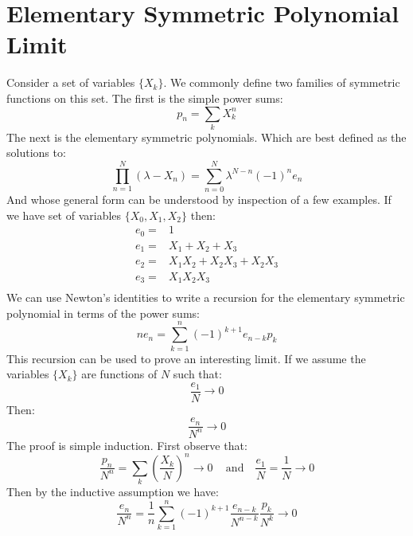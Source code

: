 
\section{Elementary Symmetric Polynomial Limit}
Consider a set of variables $\{X_k\}$.
We commonly define two families of symmetric functions on this set.
The first is the simple power sums:
\[p_n = \sum_{k}X_k^n\]
The next is the elementary symmetric polynomials.
Which are best defined as the solutions to:
\[\prod_{n=1}^{N}(\lambda -X_n) = \sum_{n=0}^{N}\lambda^{N-n}(-1)^ne_n\]
And whose general form can be understood by inspection of a few examples.
If we have set of variables $\{X_0,X_1,X_2\}$ then:
\begin{equation*}
\begin{aligned}
	e_0 =& 1\\
	e_1 =& X_1 +X_2 +X_3\\
	e_2 =& X_1X_2 +X_2X_3 +X_2X_3 \\
	e_3 =& X_1X_2X_3 \\
\end{aligned}
\end{equation*}
We can use Newton's identities to write a recursion for the elementary symmetric polynomial in terms of the power sums:
\[ne_n = \sum_{k=1}^n(-1)^{k+1}e_{n-k}p_k\]
This recursion can be used to prove an interesting limit.
If we assume the variables $\{X_k\}$ are functions of $N$ such that:
\[\frac{e_1}{N} \rightarrow 0\]
Then:
\[\frac{e_n}{N^n} \rightarrow 0\]
The proof is simple induction.
First observe that:
\[\frac{p_n}{N^n} = \sum_k\left(\frac{X_k}{N}\right)^n\rightarrow 0\,\quad\text{and}\quad\frac{e_1}{N}=\frac{1}{N}\rightarrow0\]
Then by the inductive assumption we have:
\[\frac{e_n}{N^n} = \frac{1}{n}\sum_{k=1}^n(-1)^{k+1}\frac{e_{n-k}}{N^{n-k}}\frac{p_k}{N^k}\rightarrow0\]
